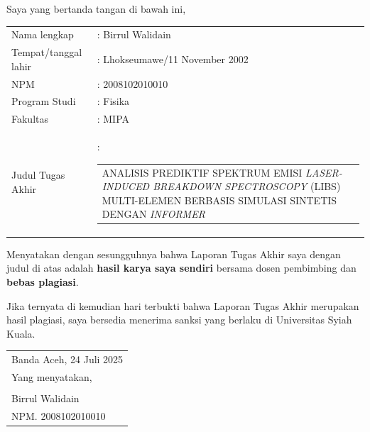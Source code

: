 \bplagiasi %
\onehalfspacing
\noindent
Saya yang bertanda tangan di bawah ini,

\vspace{0.2cm}
\noindent
\begin{center}
	\begin{tabularx}{0.9\textwidth}{@{} l X @{}} %
		Nama lengkap          & : Birrul Walidain \\
		Tempat/tanggal lahir  & : Lhokseumawe/11 November 2002 \\
		NPM                   & : 2008102010010 \\
		Program Studi         & : Fisika \\
		Fakultas              & : MIPA \\
		Judul Tugas Akhir     & : 
		\begin{tabular}[t]{@{}p{\linewidth}@{}}
			ANALISIS PREDIKTIF SPEKTRUM EMISI \textit{LASER-INDUCED BREAKDOWN SPECTROSCOPY} (LIBS)  MULTI-ELEMEN BERBASIS SIMULASI SINTETIS DENGAN   \textit{INFORMER} 
		\end{tabular} \\
	\end{tabularx}
\end{center}



\vspace{0.2cm}
\noindent
Menyatakan dengan sesungguhnya bahwa Laporan Tugas Akhir saya dengan judul di atas adalah \textbf{hasil karya saya sendiri} bersama dosen pembimbing dan \textbf{bebas plagiasi}.

\vspace{0.2cm}
\noindent
Jika ternyata di kemudian hari terbukti bahwa Laporan Tugas Akhir merupakan hasil plagiasi, saya bersedia menerima sanksi yang berlaku di Universitas Syiah Kuala.

\vspace{1cm}
\begin{onehalfspace}
	\begin{flushright} %
		\begin{tabular}{l@{}}
			Banda Aceh, 24 Juli 2025 \\[-0.15cm]
			Yang menyatakan, \\
			\\[1.5cm] %
			Birrul Walidain \\[-0.15cm]
			NPM. 2008102010010 \\
		\end{tabular}
	\end{flushright}
\end{onehalfspace}

